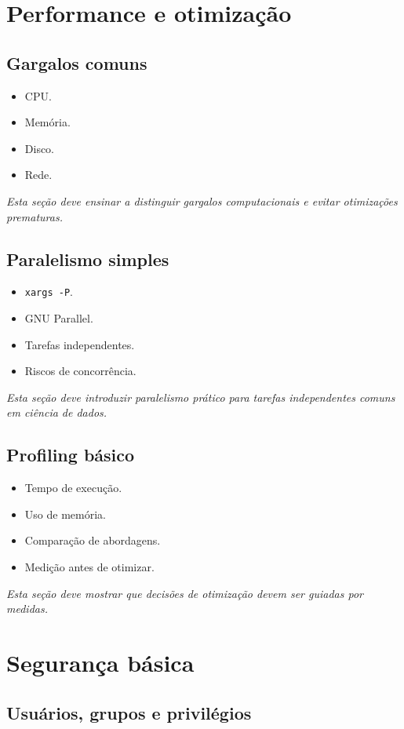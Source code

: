 \documentclass[12pt,openany]{book}
\newcommand{\placeholder}[1]{
    \par\medskip
    \noindent\textit{#1}
    \par\medskip
}
\newcommand{\topicos}[1]{
    \begin{itemize}
        #1
    \end{itemize}
}
\begin{document}
\begin{refsection}
\chapter{Performance e otimização}

\section{Gargalos comuns}

\topicos{
    \item CPU.
    \item Memória.
    \item Disco.
    \item Rede.
}

\placeholder{Esta seção deve ensinar a distinguir gargalos computacionais e evitar otimizações prematuras.}

\section{Paralelismo simples}

\topicos{
    \item \texttt{xargs -P}.
    \item GNU Parallel.
    \item Tarefas independentes.
    \item Riscos de concorrência.
}

\placeholder{Esta seção deve introduzir paralelismo prático para tarefas independentes comuns em ciência de dados.}

\section{Profiling básico}

\topicos{
    \item Tempo de execução.
    \item Uso de memória.
    \item Comparação de abordagens.
    \item Medição antes de otimizar.
}

\placeholder{Esta seção deve mostrar que decisões de otimização devem ser guiadas por medidas.}

\chapter{Segurança básica}

\section{Usuários, grupos e privilégios}


\end{refsection}
\end{document}
